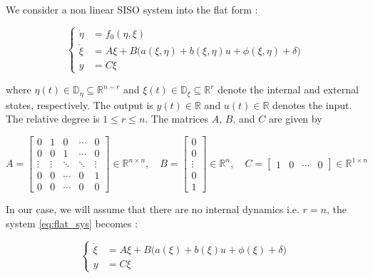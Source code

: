 We consider a non linear SISO system into the flat form :

\begin{equation}
\label{eq:flat_sys}
\left\{
\begin{aligned}
  \dot{\eta} &= f_0(\eta, \xi) \\
  \dot{\xi} &= A\xi + B\big(a(\xi,\eta) + b(\xi,\eta)u + \phi(\xi,\eta) + \delta\big) \\
  y &= C\xi
\end{aligned}
\right.
\end{equation}



where \( \eta(t) \in \mathbb{D}_\eta \subseteq \mathbb{R}^{n - r} \) and \( \xi(t) \in \mathbb{D}_\xi \subseteq \mathbb{R}^r \) denote the internal and external states, respectively.  
The output is \( y(t) \in \mathbb{R} \) and \( u(t) \in \mathbb{R} \) denotes the input. The relative degree is \( 1 \leq r \leq n \). The matrices \( A \), \( B \), and \( C \) are given by

\begin{equation}
A = 
\begin{bmatrix}
0 & 1 & 0 & \cdots & 0 \\
0 & 0 & 1 & \cdots & 0 \\
\vdots & \vdots & \ddots & \ddots & \vdots \\
0 & 0 & \cdots & 0 & 1 \\
0 & 0 & \cdots & 0 & 0 
\end{bmatrix}
\in \mathbb{R}^{n \times n}, \quad
B = 
\begin{bmatrix}
0 \\
0 \\
\vdots \\
0 \\
1 
\end{bmatrix}
\in \mathbb{R}^n, \quad
C = 
\begin{bmatrix}
1 & 0 & \cdots & 0 
\end{bmatrix}
\in \mathbb{R}^{1 \times n} 
\end{equation}

In our case, we will assume that there are no internal dynamics i.e. \( r = n\), the system \ref{eq:flat_sys} becomes : 

\begin{equation}
\label{eq:flat_sys_reduced}
\left\{
\begin{aligned}
  \dot{\xi} &= A\xi + B\big(a(\xi) + b(\xi)u + \phi(\xi) + \delta\big) \\
  y &= C\xi
\end{aligned}
\right.
\end{equation}

